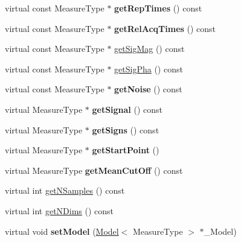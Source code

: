 \begin{DoxyCompactItemize}
\item 
\hypertarget{class_ox_1_1_calculator_a2e708f33e09e1e08345bea3024e99ec1}{virtual const Measure\-Type $\ast$ {\bfseries get\-Rep\-Times} () const }\label{class_ox_1_1_calculator_a2e708f33e09e1e08345bea3024e99ec1}

\item 
\hypertarget{class_ox_1_1_calculator_a6698aa9563e9c7d251d4ff73810dd12c}{virtual const Measure\-Type $\ast$ {\bfseries get\-Rel\-Acq\-Times} () const }\label{class_ox_1_1_calculator_a6698aa9563e9c7d251d4ff73810dd12c}

\item 
virtual const Measure\-Type $\ast$ \hyperlink{class_ox_1_1_calculator_ad9a623ee2bfc77732fa891c47c087aa9}{get\-Sig\-Mag} () const 
\item 
virtual const Measure\-Type $\ast$ \hyperlink{class_ox_1_1_calculator_acf6021ef084c24636a344a12627caff5}{get\-Sig\-Pha} () const 
\item 
\hypertarget{class_ox_1_1_calculator_abff843bf55042e78ce613caceef8e6a3}{virtual const Measure\-Type $\ast$ {\bfseries get\-Noise} () const }\label{class_ox_1_1_calculator_abff843bf55042e78ce613caceef8e6a3}

\item 
\hypertarget{class_ox_1_1_calculator_a10c8a3e18079c680cbdf54366d5dfed0}{virtual Measure\-Type $\ast$ {\bfseries get\-Signal} () const }\label{class_ox_1_1_calculator_a10c8a3e18079c680cbdf54366d5dfed0}

\item 
\hypertarget{class_ox_1_1_calculator_ac05783e37c8e6f3f457778ebbfa2e6a5}{virtual Measure\-Type $\ast$ {\bfseries get\-Signs} () const }\label{class_ox_1_1_calculator_ac05783e37c8e6f3f457778ebbfa2e6a5}

\item 
\hypertarget{class_ox_1_1_calculator_aebf55897e1f11cdd3afec75d24c8ea13}{virtual Measure\-Type $\ast$ {\bfseries get\-Start\-Point} ()}\label{class_ox_1_1_calculator_aebf55897e1f11cdd3afec75d24c8ea13}

\item 
\hypertarget{class_ox_1_1_calculator_a8232921e636ebc91a102bc2e95596a7b}{virtual Measure\-Type {\bfseries get\-Mean\-Cut\-Off} () const }\label{class_ox_1_1_calculator_a8232921e636ebc91a102bc2e95596a7b}

\item 
virtual int \hyperlink{class_ox_1_1_calculator_a5e5b6e1af84b8713c833a25d7c0dd90d}{get\-N\-Samples} () const 
\item 
virtual int \hyperlink{class_ox_1_1_calculator_a3a4266dedca7e02707e732a312b85048}{get\-N\-Dims} () const 
\item 
\hypertarget{class_ox_1_1_calculator_ab814b8876ab6ddd7585f73dd23024624}{virtual void {\bfseries set\-Model} (\hyperlink{class_ox_1_1_model}{Model}$<$ Measure\-Type $>$ $\ast$\-\_\-\-Model)}\label{class_ox_1_1_calculator_ab814b8876ab6ddd7585f73dd23024624}


\end{DoxyCompactItemize}
